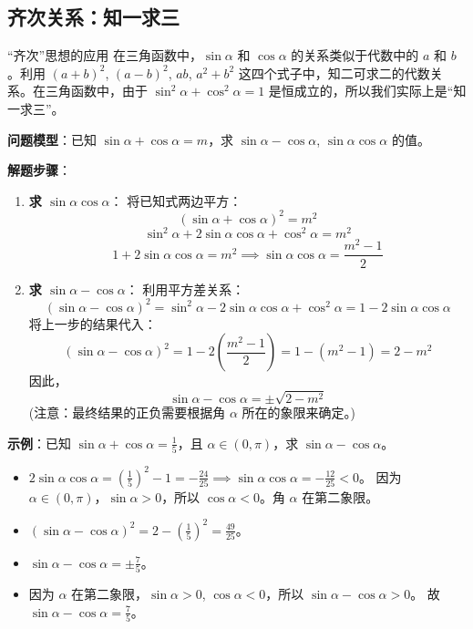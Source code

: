 \documentclass[a4paper,11pt]{ctexart}
\begin{document}
\subsection{齐次关系：知一求三}
\begin{examplebox}{“齐次”思想的应用}
在三角函数中，$\sin\alpha$ 和 $\cos\alpha$ 的关系类似于代数中的 $a$ 和 $b$。利用 $(a+b)^2$, $(a-b)^2$, $ab$, $a^2+b^2$ 这四个式子中，知二可求二的代数关系。在三角函数中，由于 $\sin^2\alpha + \cos^2\alpha = 1$ 是恒成立的，所以我们实际上是“知一求三”。

\textbf{问题模型}：已知 $\sin\alpha + \cos\alpha = m$，求 $\sin\alpha - \cos\alpha$, $\sin\alpha\cos\alpha$ 的值。

\textbf{解题步骤}：
\begin{enumerate}
    \item \textbf{求 $\sin\alpha\cos\alpha$}：
    将已知式两边平方：
    \[ (\sin\alpha + \cos\alpha)^2 = m^2 \]
    \[ \sin^2\alpha + 2\sin\alpha\cos\alpha + \cos^2\alpha = m^2 \]
    \[ 1 + 2\sin\alpha\cos\alpha = m^2 \implies \sin\alpha\cos\alpha = \frac{m^2-1}{2} \]

    \item \textbf{求 $\sin\alpha - \cos\alpha$}：
    利用平方差关系：
    \[ (\sin\alpha - \cos\alpha)^2 = \sin^2\alpha - 2\sin\alpha\cos\alpha + \cos^2\alpha = 1 - 2\sin\alpha\cos\alpha \]
    将上一步的结果代入：
    \[ (\sin\alpha - \cos\alpha)^2 = 1 - 2\left(\frac{m^2-1}{2}\right) = 1 - (m^2-1) = 2 - m^2 \]
    因此，
    \[ \sin\alpha - \cos\alpha = \pm\sqrt{2-m^2} \]
    (注意：最终结果的正负需要根据角 $\alpha$ 所在的象限来确定。)
\end{enumerate}
\textbf{示例}：已知 $\sin\alpha + \cos\alpha = \frac{1}{5}$，且 $\alpha \in (0, \pi)$，求 $\sin\alpha - \cos\alpha$。
\begin{itemize}
    \item $2\sin\alpha\cos\alpha = \left(\frac{1}{5}\right)^2 - 1 = -\frac{24}{25} \implies \sin\alpha\cos\alpha = -\frac{12}{25} < 0$。
    因为 $\alpha \in (0, \pi)$，$\sin\alpha > 0$，所以 $\cos\alpha < 0$。角 $\alpha$ 在第二象限。
    \item $(\sin\alpha - \cos\alpha)^2 = 2 - (\frac{1}{5})^2 = \frac{49}{25}$。
    \item $\sin\alpha - \cos\alpha = \pm\frac{7}{5}$。
    \item 因为 $\alpha$ 在第二象限，$\sin\alpha > 0$, $\cos\alpha < 0$，所以 $\sin\alpha - \cos\alpha > 0$。
    故 $\sin\alpha - \cos\alpha = \frac{7}{5}$。
\end{itemize}
\end{examplebox}
\end{document}
